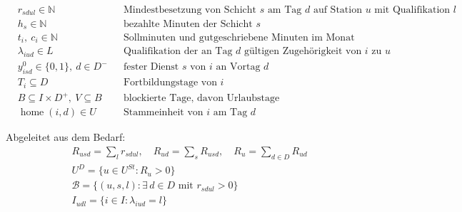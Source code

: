 \documentclass[11pt]{combiArticle}
\newcommand{\Dm}{D^{-}}
\begin{document}
\begin{align}
  & r_{sdul} \in \mathbb{N} && \text{Mindestbesetzung von Schicht } s \text{ am Tag } d \text{ auf Station } u \text{ mit Qualifikation } l \label{par:r}\\
  & h_s \in \mathbb{N} && \text{bezahlte Minuten der Schicht } s \label{par:h}\\
  & t_i,\ c_i \in \mathbb{N} && \text{Sollminuten und gutgeschriebene Minuten im Monat} \label{par:t}\\
  & \lambda_{iud} \in L && \text{Qualifikation der an Tag } d \text{ gültigen Zugehörigkeit von } i \text{ zu } u \label{par:lambda}\\
  & y^{0}_{isd} \in \{0,1\},\ d \in \Dm && \text{fester Dienst } s \text{ von } i \text{ an Vortag } d \label{par:y0}\\
  & T_i \subseteq D && \text{Fortbildungstage von } i \label{par:T}\\
  & B \subseteq I \times D^{+},\ V \subseteq B && \text{blockierte Tage, davon Urlaubstage} \label{par:B}\\
  & \operatorname{home}(i,d) \in U && \text{Stammeinheit von } i \text{ am Tag } d \label{par:home}
\end{align}

Abgeleitet aus dem Bedarf:
\begin{align}
  & R_{usd} = \textstyle\sum_{l} r_{sdul},\quad R_{ud} = \sum_{s} R_{usd},\quad R_{u} = \sum_{d \in D} R_{ud} \label{par:R}\\
  & U^{D} = \{u \in U^{St} : R_u > 0\} \label{par:UD}\\
  & \mathcal{B} = \{(u,s,l) : \exists\, d \in D \text{ mit } r_{sdul} > 0\} \label{par:demanded}\\
  & I_{udl} = \{i \in I : \lambda_{iud} = l\} \label{par:Iudl}
\end{align}
\end{document}
